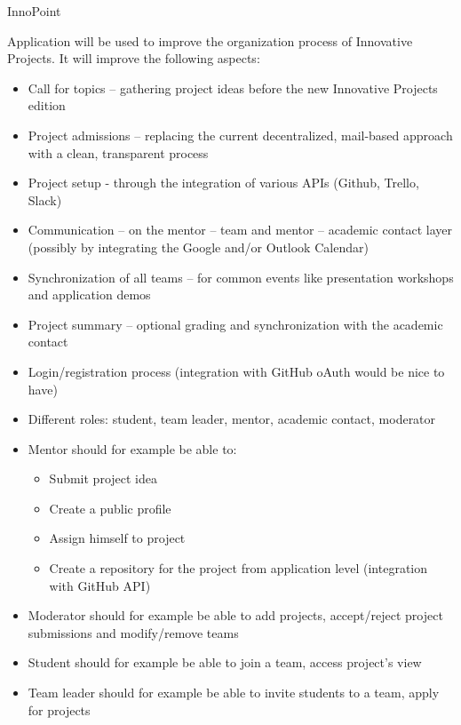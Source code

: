 \begin{project}
{InnoPoint}
{
\begin{small}
Application will be used to improve the organization process of Innovative Projects. It will improve the following aspects:
\begin{itemize}
	\item Call for topics – gathering project ideas before the new Innovative Projects edition
	\item Project admissions – replacing the current decentralized, mail-based approach with a clean, transparent process
	\item Project setup - through the integration of various APIs (Github, Trello, Slack)
	\item Communication – on the mentor – team and mentor – academic contact layer (possibly by integrating the Google and/or Outlook Calendar)
	\item Synchronization of all teams – for common events like presentation workshops and application demos
	\item Project summary – optional grading and synchronization with the academic contact
\end{itemize}
\end{small}
}
{
\begin{small}
\begin{itemize}
	\item Login/registration process (integration with GitHub oAuth would be nice to have)
	\item Different roles: student, team leader, mentor, academic contact, moderator
	\item Mentor should for example be able to:
		\begin{itemize}
			\item Submit project idea
			\item Create a public profile
			\item Assign himself to project
			\item Create a repository for the project from application level (integration with GitHub API)
		\end{itemize}
	\item Moderator should for example be able to add projects, accept/reject project submissions and modify/remove teams
	\item Student should for example be able to join a team, access project's view
	\item Team leader should for example be able to invite students to a team, apply for projects

\end{itemize}
\end{small}}
\end{project}

